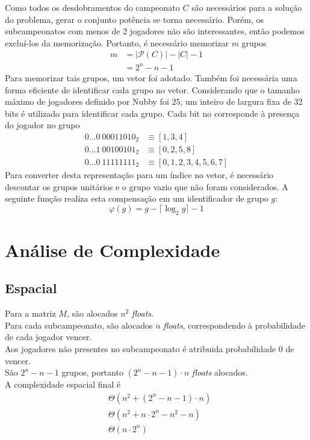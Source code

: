 \documentclass{article}
\begin{document}
Como todos os desdobramentos do campeonato $C$ são necessários para a solução do problema, gerar o conjunto potência se torna necessário. Porém, os subcampeonatos com menos de 2 jogadores não são interessantes, então podemos excluí-los da memorização. Portanto, é necessário memorizar $m$ grupos
\begin{align*}
  m & = |\mathcal{P}(C)| - |C| - 1 \\
  & = 2^n - n - 1
\end{align*}
Para memorizar tais grupos, um vetor foi adotado. Também foi necessária uma forma eficiente de identificar cada grupo no vetor. Considerando que o tamanho máximo de jogadores definido por Nubby foi $25$, um inteiro de largura fixa de 32 bits é utilizado para identificar cada grupo. Cada bit no corresponde à presença do jogador no grupo
\begin{align*}
  0 \hdots 0 \> 00011010_2 &\equiv [1, 3, 4] \\
  0 \hdots 1 \> 00100101_2 &\equiv [0, 2, 5, 8] \\
  0 \hdots 0 \> 11111111_2 &\equiv [0, 1, 2, 3, 4, 5, 6, 7]
\end{align*}
Para converter desta representação para um índice no vetor, é necessário descontar os grupos unitários e o grupo vazio que não foram considerados. A seguinte função realiza esta compensação em um identificador de grupo $g$:
\[ \varphi(g) = g - \lceil \log_2 g \rceil - 1 \]


\pagebreak


\section{Análise de Complexidade}

\subsection{Espacial}
\noindent Para a matriz $M$, são alocados $n^2$ \textit{floats}.\\[5pt]
Para cada subcampeonato, são alocados $n$ \textit{floats}, correspondendo à probabilidade de cada jogador vencer.\\
Aos jogadores não presentes no subcampeonato é atribuida probabilidade $0$ de vencer. \\[5pt]
São $2^n - n - 1$ grupos, portanto $(2^n - n - 1) \cdot n$ \textit{floats} alocados. \\[5pt]
A complexidade espacial final é
\begin{align*}
  & \Theta \left( n^2 + (2^n - n - 1) \cdot n \right) \\
  & \Theta \left( n^2 + n \cdot 2^n - n^2 - n \right) \\
  & \Theta \left(n \cdot 2^n \right)
\end{align*}
\end{document}
